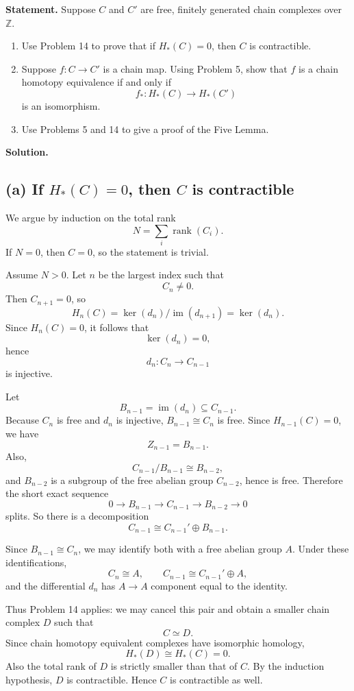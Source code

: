 \documentclass[12pt,a4paper]{article}
\theoremstyle{notespace}
\begin{document}
\textbf{Statement.}
Suppose \(C\) and \(C'\) are free, finitely generated chain complexes over \(\mathbb Z\).

\begin{enumerate}
	\item[(a)] Use Problem 14 to prove that if \(H_*(C)=0\), then \(C\) is contractible.
	\item[(b)] Suppose \(f:C\to C'\) is a chain map. Using Problem 5, show that \(f\) is a chain homotopy equivalence if and only if
	\[
	f_*:H_*(C)\to H_*(C')
	\]
	is an isomorphism.
	\item[(c)] Use Problems 5 and 14 to give a proof of the Five Lemma.
\end{enumerate}

\medskip

\textbf{Solution.}

\subsection*{(a) If \(H_*(C)=0\), then \(C\) is contractible}

We argue by induction on the total rank
\[
N=\sum_i \operatorname{rank}(C_i).
\]
If \(N=0\), then \(C=0\), so the statement is trivial.

Assume \(N>0\). Let \(n\) be the largest index such that
\[
C_n\neq 0.
\]
Then \(C_{n+1}=0\), so
\[
H_n(C)=\ker(d_n)/\operatorname{im}(d_{n+1})=\ker(d_n).
\]
Since \(H_n(C)=0\), it follows that
\[
\ker(d_n)=0,
\]
hence
\[
d_n:C_n\to C_{n-1}
\]
is injective.

Let
\[
B_{n-1}=\operatorname{im}(d_n)\subseteq C_{n-1}.
\]
Because \(C_n\) is free and \(d_n\) is injective, \(B_{n-1}\cong C_n\) is free. Since \(H_{n-1}(C)=0\), we have
\[
Z_{n-1}=B_{n-1}.
\]
Also,
\[
C_{n-1}/B_{n-1}\cong B_{n-2},
\]
and \(B_{n-2}\) is a subgroup of the free abelian group \(C_{n-2}\), hence is free. Therefore the short exact sequence
\[
0\to B_{n-1}\to C_{n-1}\to B_{n-2}\to 0
\]
splits. So there is a decomposition
\[
C_{n-1}\cong C_{n-1}'\oplus B_{n-1}.
\]

Since \(B_{n-1}\cong C_n\), we may identify both with a free abelian group \(A\). Under these identifications,
\[
C_n\cong A,\qquad C_{n-1}\cong C_{n-1}'\oplus A,
\]
and the differential \(d_n\) has \(A\to A\) component equal to the identity.

Thus Problem 14 applies: we may cancel this pair and obtain a smaller chain complex \(D\) such that
\[
C\simeq D.
\]
Since chain homotopy equivalent complexes have isomorphic homology,
\[
H_*(D)\cong H_*(C)=0.
\]
Also the total rank of \(D\) is strictly smaller than that of \(C\). By the induction hypothesis, \(D\) is contractible. Hence \(C\) is contractible as well.
\end{document}
